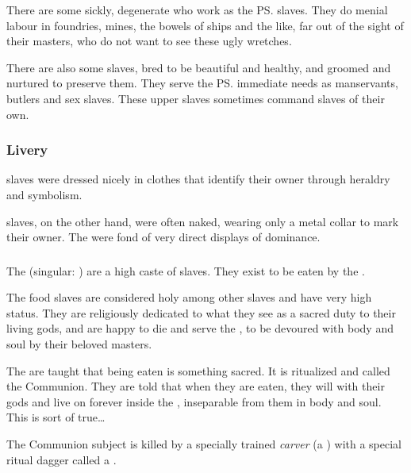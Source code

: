 There are some sickly, degenerate \humans{} who work as the \ps{\resphain}{} slaves. 
They do menial labour in foundries, mines, the bowels of ships and the like, far out of the sight of their masters, who do not want to see these ugly wretches. 

There are also some  slaves, bred to be beautiful and healthy, and groomed and nurtured to preserve them. They serve the \ps{\resphain}{} immediate needs as manservants, butlers and sex slaves. 
These upper slaves sometimes command slaves of their own. 





\subsubsection{Livery}
\CiriathSepher{} slaves were dressed nicely in clothes that identify their owner through heraldry and symbolism. 

\Mystraacht{} slaves, on the other hand, were often naked, wearing only a metal collar to mark their owner. 
The \Mystraacht{} were fond of very direct displays of dominance. 





\subsubsection{\Naorim}
\index{\naor}
The \naorim{} (singular: \naor) are a high caste of slaves. 
They exist to be eaten by the \resphain. 

The food slaves are considered holy among other slaves and have very high status. 
They are religiously dedicated to what they see as a sacred duty to their living gods, and are happy to die and serve the \resphain{}, to be devoured with body and soul by their beloved masters. 

The \naorim{} are taught that being eaten is something sacred. 
It is ritualized and called the Communion. 
They are told that when they are eaten, they will  with their \resphan{} gods and live on forever inside the \resphain, inseparable from them in body and soul. 
This is sort of true\ldots{}

\index{\gelveir}
The Communion subject is killed by a specially trained \emph{carver} (a \human) with a special ritual dagger called a \gelveir. 

